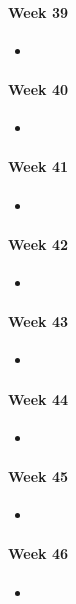 \paragraph{Week 39}
\begin{itemize}
    \item 
\end{itemize}
\paragraph{Week 40}
\begin{itemize}
    \item 
\end{itemize}
\paragraph{Week 41}
\begin{itemize}
    \item 
\end{itemize}
\paragraph{Week 42}
\begin{itemize}
    \item 
\end{itemize}
\paragraph{Week 43}
\begin{itemize}
    \item 
\end{itemize}
\paragraph{Week 44}
\begin{itemize}
    \item 
\end{itemize}
\paragraph{Week 45}
\begin{itemize}
    \item 
\end{itemize}
\paragraph{Week 46}
\begin{itemize}
    \item 
\end{itemize}
